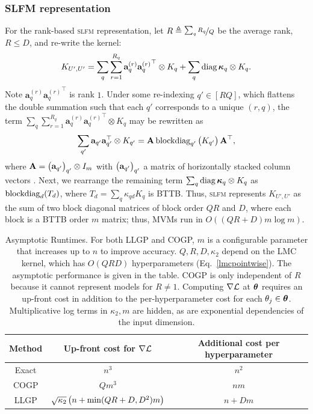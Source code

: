 \documentclass[twoside]{article}
\begin{document}
\subsubsection{SLFM representation}

For the rank-based \textsc{slfm} representation, let $R\triangleq \nicefrac{\sum_qR_q}{Q}$ be the average rank, $R\le D$, and re-write the kernel:
\begin{align*}
  K_{{U'},{U'}}=\sum_q\sum_{r=1}^{R_q}\textbf{a}_q^{(r)}{\textbf{a}_q^{(r)}}^\top\otimes K_q + \sum_q\operatorname{diag}{\boldsymbol\kappa}_q \otimes K_q.
\end{align*}
Note $\textbf{a}_q^{(r)}{\textbf{a}_q^{(r)}}^\top$ is rank $1$. Under some re-indexing $q'\in[RQ]$, which flattens the double summation such that each $q'$ corresponds to a unique $(r, q)$, the term $\sum_q\sum_{r=1}^{R_q}\textbf{a}_q^{(r)}{\textbf{a}_q^{(r)}}^\top\otimes K_q $ may be rewritten as
\begin{align*}
  \sum_{q'}\textbf{a}_{q'}\textbf{a}_{q'}^\top\otimes K_{q'} = \textbf{A}\operatorname{blockdiag}_{q'}\begin{pmatrix} K_{q'} \end{pmatrix}\textbf{A}^\top,
\end{align*}
where $\textbf{A}=\begin{pmatrix}  \textbf{a}_{q'} \end{pmatrix}_{q'}\otimes I_m$ with $\begin{pmatrix}  \textbf{a}_{q'} \end{pmatrix}_{q'}$ a matrix of horizontally stacked column vectors \citep{seeger2005semiparametric}. Next, we rearrange the remaining term $\sum_q\operatorname{diag}{\boldsymbol\kappa}_q \otimes K_q$ as $\operatorname{blockdiag}_d(T_d)$, where $T_d=\sum_q \kappa_{qd}K_q$ is BTTB. Thus, \textsc{slfm} represents $K_{{U'},{U'}}$ as the sum of two block diagonal matrices of block order $QR$ and $D$, where each block is a BTTB order $m$ matrix; thus, MVMs run in $O((QR + D)m\log m)$.

\begin{table}[!ht]
  \caption{
   Asymptotic Runtimes. For both LLGP and COGP, $m$ is a configurable parameter that increases up to $n$ to improve accuracy. $Q,R,D,\kappa_2$ depend on the LMC kernel, which has $O(QRD)$ hyperparameters (Eq.~\ref{lmcpointwise}). The asymptotic performance is given in the table. COGP is only independent of $R$ because it cannot represent models for $R\neq 1$. Computing $\nabla\mathcal{L}$ at ${\boldsymbol\theta}$ requires an up-front cost in addition to the per-hyperparameter cost for each $\theta_j\in{\boldsymbol\theta}$. Multiplicative log terms in $\kappa_2, m$ are hidden, as are exponential dependencies of the input dimension.
  }
\label{asymp}
\begin{sc}
\begin{center}
\begin{small}
\begin{tabular}{ccc}
  \toprule
  Method & Up-front cost for $\nabla \mathcal{L}$ & Additional cost per hyperparameter\\
  \midrule
  Exact & $n^3$ & $n^2 $\\
  COGP & $Qm^3$ & $nm$ \\
  LLGP & $\sqrt{\kappa_2} \left({n +\min(QR+D, D^2) m}\right)$ &  $n + D m$ \\
  \bottomrule
\end{tabular}
\end{small}
\end{center}
\end{sc}
\end{table}
\end{document}
